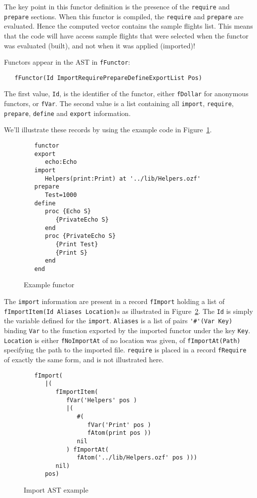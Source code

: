 \documentclass[a4paper]{memoir}
\begin{document}
The key point in this functor definition is the presence of the
\lstinline!require! and \lstinline!prepare! sections. When this functor is
compiled, the \lstinline!require! and \lstinline!prepare! are evaluated.
Hence the computed vector contains the sample flights list.
This means that the code will have access sample flights that were selected when
the functor was evaluated (built), and not when it was applied (imported)!

Functors appear in the AST in \lstinline!fFunctor!:
\begin{lstlisting}
   fFunctor(Id ImportRequirePrepareDefineExportList Pos)
\end{lstlisting}
The first value, \lstinline!Id!, is the identifier of the functor, either
\lstinline!fDollar! for anonymous functors, or \lstinline!fVar!.
The second value is a list containing all \lstinline!import!,
\lstinline!require!, \lstinline!prepare!, \lstinline!define! and
\lstinline!export! information. 

We'll illustrate these records by using the example code in
Figure~\ref{fig:functor_example_code}.
\begin{figure}[ht]
\begin{lstlisting}
   functor
   export
      echo:Echo
   import
      Helpers(print:Print) at '../lib/Helpers.ozf'
   prepare
      Test=1000
   define
      proc {Echo S}
         {PrivateEcho S}
      end
      proc {PrivateEcho S}
         {Print Test}
         {Print S}
      end
   end
\end{lstlisting}
\caption{Example functor}
\label{fig:functor_example_code}
\end{figure}


The \lstinline!import! information are present in a record \lstinline!fImport!
holding a list of \lstinline!fImportItem(Id Aliases Location)!s as illustrated in
Figure~\ref{fig:functor_example_import}.
The \lstinline!Id! is simply the variable defined for the \lstinline!import!.
\lstinline!Aliases! is a list of pairs \lstinline!'#'(Var Key)! binding
\lstinline!Var! to the function exported by the imported functor under the key
\lstinline!Key!.
\lstinline!Location! is either \lstinline!fNoImportAt! of no location was given,
of \lstinline!fImportAt(Path)! specifying the path to the imported file.
\lstinline!require! is placed in a record \lstinline!fRequire! of exactly the same form, and is not illustrated here.

\begin{figure}[ht]
\begin{lstlisting}
   fImport(
      |(
         fImportItem(
            fVar('Helpers' pos )
            |(
               #(
                  fVar('Print' pos )
                  fAtom(print pos ))
               nil
            ) fImportAt(
               fAtom('../lib/Helpers.ozf' pos )))
         nil)
      pos)
\end{lstlisting}
\caption{Import AST example}
\label{fig:functor_example_import}
\end{figure}
\end{document}
